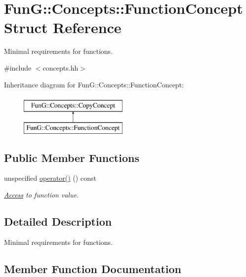\hypertarget{structFunG_1_1Concepts_1_1FunctionConcept}{}\section{FunG\+:\+:Concepts\+:\+:Function\+Concept Struct Reference}
\label{structFunG_1_1Concepts_1_1FunctionConcept}


Minimal requirements for functions.  




{\ttfamily \#include $<$concepts.\+hh$>$}

Inheritance diagram for FunG\+:\+:Concepts\+:\+:Function\+Concept\+:\begin{figure}[H]
\begin{center}
\leavevmode
\includegraphics[height=2.000000cm]{structFunG_1_1Concepts_1_1FunctionConcept}
\end{center}
\end{figure}
\subsection*{Public Member Functions}
\begin{DoxyCompactItemize}
\item 
unspecified \hyperlink{structFunG_1_1Concepts_1_1FunctionConcept_ae09a34291f803c3139038e944a4e399d}{operator()} () const 
\begin{DoxyCompactList}\small\item\em \hyperlink{namespaceFunG_1_1Access}{Access} to function value. \end{DoxyCompactList}\end{DoxyCompactItemize}


\subsection{Detailed Description}
Minimal requirements for functions. 

\subsection{Member Function Documentation}
